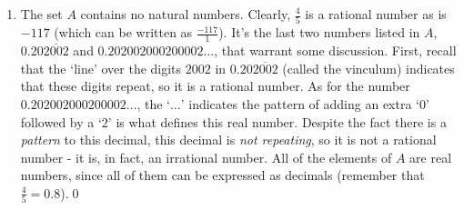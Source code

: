 {\begin{enumerate}

\smallskip

So suppose $s \in S$.  What can be said about $s$?  We know there is some real number $x$ so that $s = x^2$.  Since $x^2 \geq 0$ for any real number $x$, we know $s \geq 0$.  This tells us that everything in $S$ is a non-negative real number.  This begs the question:  are \underline{all} of the non-negative real numbers in $S$?  Suppose $n$ is a non-negative real number, that is, $n \geq 0$.  If $n$ were in $S$, there would be a real number $x$ so that $x^2=n$.  As you may recall, we can solve $x^2 = n$ by `extracting square roots':  $x = \pm \sqrt{n}$.  Since $n \geq 0$, $\sqrt{n}$ is a real number. Moreover, $(\sqrt{n})^2 = n$ so $n$ is the square of a real number which means $n \in S$. Hence, $S$ is the set of non-negative real numbers.

\item  The set $A$ contains no natural numbers. Clearly, $\frac{4}{5}$ is a rational number as is $-117$ (which can be written as $\frac{-117}{1}$). It's the last two numbers listed in $A$, $0.20\overline{2002}$ and $0.202002000200002 \ldots$, that warrant some discussion.  First, recall that the `line' over the digits $2002$ in $0.20\overline{2002}$ (called the vinculum) indicates that these digits repeat, so it is a rational number. As for the number $0.202002000200002 \ldots$, the `$\ldots$' indicates the pattern of adding an extra `$0$' followed by a `$2$' is what defines this real number.  Despite the fact there is a \textit{pattern} to this decimal, this decimal is \textit{not repeating}, so it is not a rational number - it is, in fact, an irrational number.  All of the elements of $A$ are real numbers, since all of them can be expressed as decimals (remember that $\frac{4}{5} = 0.8$).\qed



\end{enumerate}
}


